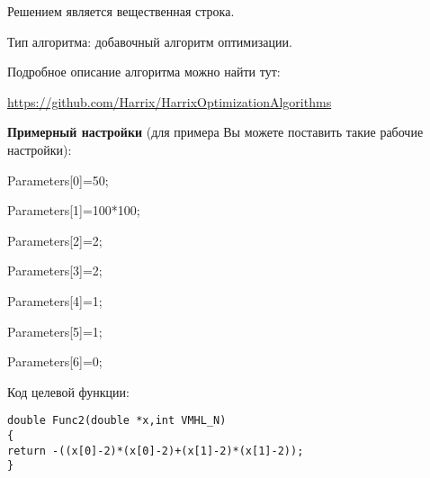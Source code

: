 \documentclass[a4paper,12pt]{article}
\begin{document}
Решением является вещественная строка.

Тип алгоритма: добавочный алгоритм оптимизации.

Подробное описание алгоритма можно найти тут:

\href{https://github.com/Harrix/HarrixOptimizationAlgorithms/blob/master/\_HarrixOptimizationAlgorithms.pdf}{https://github.com/Harrix/HarrixOptimizationAlgorithms}

\textbf{Примерный настройки} (для примера Вы можете поставить такие рабочие настройки):

 Parameters[0]=50;
 
Parameters[1]=100*100;

Parameters[2]=2;

Parameters[3]=2;

Parameters[4]=1;

Parameters[5]=1;

Parameters[6]=0;

Код целевой функции:
\begin{lstlisting}[caption=Оптимизируемая функция]
double Func2(double *x,int VMHL_N)
{
return -((x[0]-2)*(x[0]-2)+(x[1]-2)*(x[1]-2));
}
\end{lstlisting}
\end{document}
